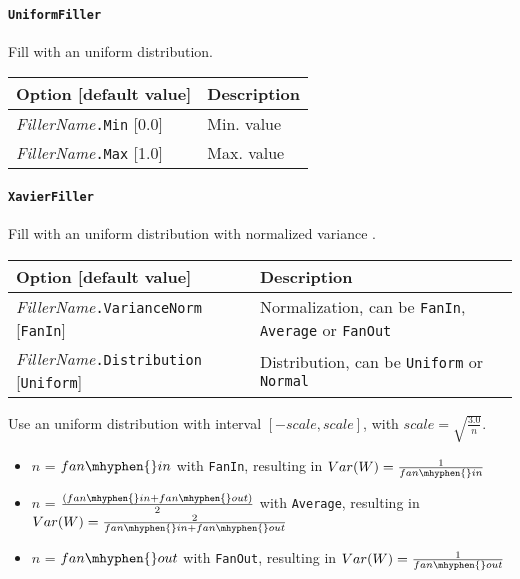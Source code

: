 \documentclass[a4paper,11pt,oneside]{article}
\newenvironment{myitemize}
{ \begin{itemize}
    \setlength{\itemsep}{0pt}
    \setlength{\parskip}{0pt}
    \setlength{\parsep}{0pt}     }
{ \end{itemize}                  }
\begin{document}
\paragraph{\texorpdfstring{%
\lstinline[basicstyle=\ttfamily\bfseries]!UniformFiller!}{UniformFiller}}
Fill with an uniform distribution.

\begin{center}
 \begin{tabular}{| p{5cm} | p{10cm} | }
 \hline
 Option [default value] & Description\\
 \hline\hline
    \emph{FillerName}\lstinline!.Min! [0.0] & Min. value \\
    \emph{FillerName}\lstinline!.Max! [1.0] & Max. value \\
 \hline
\end{tabular}
\end{center}


\paragraph{\label{par:XavierFiller}\texorpdfstring{%
\lstinline[basicstyle=\ttfamily\bfseries]!XavierFiller!}{XavierFiller}}
Fill with an uniform distribution with normalized variance \citep{Glorot2010}.

\begin{center}
 \begin{tabular}{| p{5cm} | p{10cm} | }
 \hline
 Option [default value] & Description\\
 \hline\hline
    \emph{FillerName}\lstinline!.VarianceNorm! [\lstinline!FanIn!]
    & Normalization, can be \lstinline!FanIn!, \lstinline!Average!
    or \lstinline!FanOut! \\
    \emph{FillerName}\lstinline!.Distribution! [\lstinline!Uniform!]
    & Distribution, can be \lstinline!Uniform! or \lstinline!Normal! \\
 \hline
\end{tabular}
\end{center}

Use an uniform distribution with interval $[-scale,scale]$, with $scale = \sqrt{\frac{3.0}{n}}$.

\begin{myitemize}
\item $n$ = $fan\mhyphen{}in$ with \lstinline!FanIn!, resulting in
$Var(W)=\frac{1}{fan\mhyphen{}in}$ \\
\item $n$ = $\frac{(fan\mhyphen{}in + fan\mhyphen{}out)}{2}$ with
\lstinline!Average!, resulting in
$Var(W)=\frac{2}{fan\mhyphen{}in + fan\mhyphen{}out}$ \\
\item $n$ = $fan\mhyphen{}out$ with \lstinline!FanOut!, resulting in
$Var(W)=\frac{1}{fan\mhyphen{}out}$
\end{myitemize}
\end{document}
